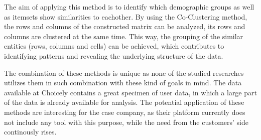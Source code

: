 The aim of applying this method is to identify which demographic groups as well as itemsets show similarities to eachother. By using the Co-Clustering method, the rows and columns of the constructed matrix can be analyzed, its rows and columns are clustered at the same time. This way, the grouping of the similar entities (rows, columns and cells) can be achieved, which contributes to identifying patterns and revealing the underlying structure of the data.

The combination of these methods is unique as none of the studied researches utilizes them in such combination with these kind of goals in mind. The data available at Choicely contains a great specimen of user data, in which a large part of the data is already available for analysis. The potential application of these methods are interesting for the case company, as their platform currently does not include any tool with this purpose, while the need from the customers' side continously rises.